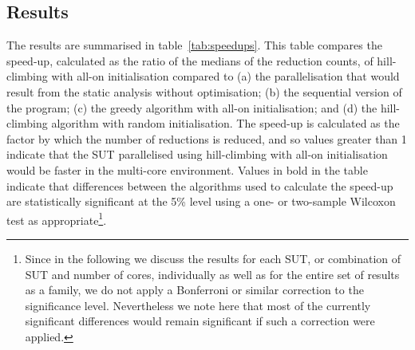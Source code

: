 \subsection{Results}

The results are summarised in table~\ref{tab:speedups}.  This table compares the speed-up, calculated as the ratio of the medians of the reduction counts, of hill-climbing with all-on initialisation compared to (a) the parallelisation that would result from the static analysis without optimisation; (b) the sequential version of the program; (c) the greedy algorithm with all-on initialisation; and (d) the hill-climbing algorithm with random initialisation.  The speed-up is calculated as the factor by which the number of reductions is reduced, and so values greater than 1 indicate that the SUT parallelised using hill-climbing with all-on initialisation would be faster in the multi-core environment.  Values in bold in the table indicate that differences between the algorithms used to calculate the speed-up are statistically significant at the 5\% level using a one- or two-sample Wilcoxon test as appropriate\footnote{Since in the following we discuss the results for each SUT, or combination of SUT and number of cores, individually as well as for the entire set of results as a family, we do not apply a Bonferroni or similar correction to the significance level.  Nevertheless we note here that most of the currently significant differences would remain significant if such a correction were applied.}.

